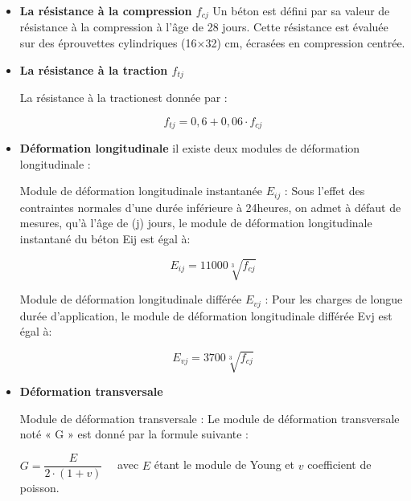 \documentclass[12pt,a4paper]{report}
\numberwithin{equation}{section}
\begin{document}
	\begin{itemize}
		
		\item \textbf{La résistance à la compression $f_{cj}$} Un béton est défini par sa valeur de résistance à la compression à l’âge de 28 jours. Cette résistance est évaluée sur des éprouvettes cylindriques (16×32) cm, écrasées en compression centrée.
		
		\item \textbf{La résistance à la traction $f_{tj}$}
		
		\subitem La résistance à la traction\footnotemark[2] est donnée par :
		
		\subitem \begin{equation}
			f_{tj} = 0,6 + 0,06 \cdot f_{cj}
			\label{eq:ft28}
		\end{equation}
		
		
		\item \textbf{Déformation longitudinale} il existe deux modules de déformation longitudinale :
		
		\subitem Module de déformation longitudinale instantanée $E_{ij}$ : Sous l’effet des contraintes normales d’une durée inférieure à 24heures, on admet à défaut de mesures, qu’à l’âge de (j) jours, le module de déformation longitudinale instantané du béton Eij est égal à\footnotemark[2] :
		
		\subsubitem \begin{equation}
			E_{ij} = 11000\sqrt[3]{f_{cj}} 
		\end{equation}
		
		
		\subitem Module de déformation longitudinale différée $E_{vj}$ : Pour les charges de longue durée d’application, le module de déformation longitudinale différée Evj est égal à\footnotemark[2] :
		
		\subsubitem \begin{equation}
			E_{vj} = 3700\sqrt[3]{f_{cj}}
			\label{eq:module-young-dif}
		\end{equation}
		
		
		
		\item \textbf{Déformation transversale}
		
		\subitem Module de déformation transversale : Le module de déformation transversale noté « G » est donné par la formule suivante :
		
		\subsubitem $G = \dfrac{E}{2 \cdot (1 + v)} \quad$ avec $E$ étant le module de Young et $v$ coefficient de poisson.
		
		
		
	\end{itemize}	
	
\end{document}
